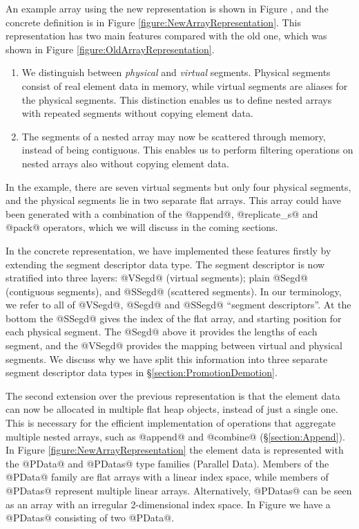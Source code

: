 An example array using the new representation is shown in Figure \REF, and the concrete definition is in Figure \ref{figure:NewArrayRepresentation}. This representation has two main features compared with the old one, which was shown in Figure \ref{figure:OldArrayRepresentation}.


\begin{enumerate}
\item   We distinguish between \emph{physical} and \emph{virtual} segments. Physical segments consist of real element data in memory, while virtual segments are aliases for the physical segments. This distinction enables us to define nested arrays with repeated segments without copying element data.

\item   The segments of a nested array may now be scattered through memory, instead of being contiguous. This enables us to perform filtering operations on nested arrays also without copying element data.
\end{enumerate}

In the example, there are seven virtual segments but only four physical segments, and the physical segments lie in two separate flat arrays. This array could have been generated with a combination of the @append@, @replicate_s@ and @pack@ operators, which we will discuss in the coming sections.

In the concrete representation, we have implemented these features firstly by extending the segment descriptor data type. The segment descriptor is now stratified into three layers: @VSegd@ (virtual segments); plain @Segd@ (contiguous segments), and @SSegd@ (scattered segments). In our terminology, we refer to all of @VSegd@, @Segd@ and @SSegd@ ``segment descriptors''. At the bottom the @SSegd@ gives the index of the flat array, and starting position for each physical segment. The @Segd@ above it provides the lengths of each segment, and the @VSegd@ provides the mapping between virtual and physical segments. We discuss why we have split this information into three separate segment descriptor data types in \S\ref{section:PromotionDemotion}.

The second extension over the previous representation is that the element data can now be allocated in multiple flat heap objects, instead of just a single one. This is necessary for the efficient implementation of  operations that aggregate multiple nested arrays, such as @append@ and @combine@ (\S\ref{section:Append}). In Figure \ref{figure:NewArrayRepresentation} the element data is represented with the @PData@ and @PDatas@ type families (Parallel Data). Members of the @PData@ family are flat arrays with a linear index space, while members of @PDatas@ represent multiple linear arrays. Alternatively, @PDatas@ can be seen as an array with an irregular 2-dimensional index space. In Figure \REF we have a @PDatas@ consisting of two @PData@.


